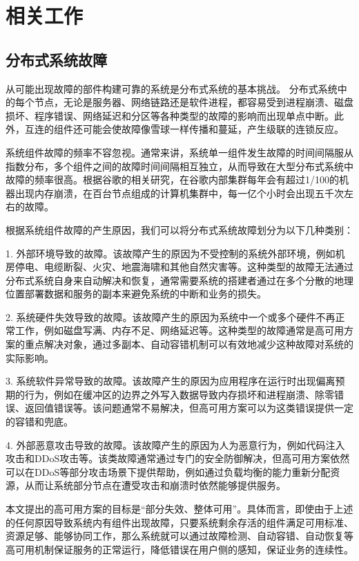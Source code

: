 
\chapter{相关工作}

\section{分布式系统故障}

从可能出现故障的部件构建可靠的系统是分布式系统的基本挑战。
分布式系统中的每个节点，无论是服务器、网络链路还是软件进程，都容易受到进程崩溃、磁盘损坏、程序错误、网络延迟和分区等各种类型的故障的影响而出现单点中断。此外，互连的组件还可能会使故障像雪球一样传播和蔓延，产生级联的连锁反应。

系统组件故障的频率不容忽视。通常来讲，系统单一组件发生故障的时间间隔服从指数分布，多个组件之间的故障时间间隔相互独立，从而导致在大型分布式系统中故障的频率很高。根据谷歌的相关研究\cite{beyer2016site}，在谷歌内部集群每年会有超过1/100的机器出现内存崩溃，在百台节点组成的计算机集群中，每一亿个小时会出现五千次左右的故障。

根据系统组件故障的产生原因，我们可以将分布式系统故障划分为以下几种类别\cite{michaud20062}：

1. 外部环境导致的故障。该故障产生的原因为不受控制的系统外部环境，例如机房停电、电缆断裂、火灾、地震海啸和其他自然灾害等。这种类型的故障无法通过分布式系统自身来自动解决和恢复，通常需要系统的搭建者通过在多个分散的地理位置部署数据和服务的副本来避免系统的中断和业务的损失。

2. 系统硬件失效导致的故障。该故障产生的原因为系统中一个或多个硬件不再正常工作，例如磁盘写满、内存不足、网络延迟等。这种类型的故障通常是高可用方案的重点解决对象，通过多副本、自动容错机制可以有效地减少这种故障对系统的实际影响。

3. 系统软件异常导致的故障。该故障产生的原因为应用程序在运行时出现偏离预期的行为，例如在缓冲区的边界之外写入数据导致内存损坏和进程崩溃、除零错误、返回值错误等。该问题通常不易解决，但高可用方案可以为这类错误提供一定的容错和兜底。

4. 外部恶意攻击导致的故障。该故障产生的原因为人为恶意行为，例如代码注入攻击和DDoS攻击等。该类故障通常通过专门的安全防御解决，但高可用方案依然可以在DDoS等部分攻击场景下提供帮助，例如通过负载均衡的能力重新分配资源，从而让系统部分节点在遭受攻击和崩溃时依然能够提供服务。

本文提出的高可用方案的目标是“部分失效、整体可用”。具体而言，即使由于上述的任何原因导致系统内有组件出现故障，只要系统剩余存活的组件满足可用标准、资源足够、能够协同工作，那么系统就可以通过故障检测、自动容错、自动恢复等高可用机制保证服务的正常运行，降低错误在用户侧的感知，保证业务的连续性。

